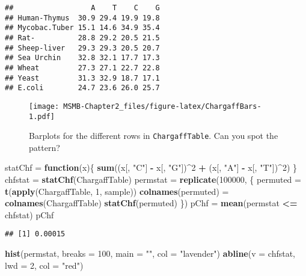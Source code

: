 \documentclass[]{article}
\newenvironment{Shaded}{\begin{snugshade}}{\end{snugshade}}
\newcommand{\KeywordTok}[1]{\textcolor[rgb]{0.13,0.29,0.53}{\textbf{#1}}}
\newcommand{\DataTypeTok}[1]{\textcolor[rgb]{0.13,0.29,0.53}{#1}}
\newcommand{\DecValTok}[1]{\textcolor[rgb]{0.00,0.00,0.81}{#1}}
\newcommand{\StringTok}[1]{\textcolor[rgb]{0.31,0.60,0.02}{#1}}
\newcommand{\ControlFlowTok}[1]{\textcolor[rgb]{0.13,0.29,0.53}{\textbf{#1}}}
\newcommand{\OperatorTok}[1]{\textcolor[rgb]{0.81,0.36,0.00}{\textbf{#1}}}
\newcommand{\NormalTok}[1]{#1}
\begin{document}
\begin{verbatim}
##                  A    T    C    G
## Human-Thymus  30.9 29.4 19.9 19.8
## Mycobac.Tuber 15.1 14.6 34.9 35.4
## Rat-          28.8 29.2 20.5 21.5
## Sheep-liver   29.3 29.3 20.5 20.7
## Sea Urchin    32.8 32.1 17.7 17.3
## Wheat         27.3 27.1 22.7 22.8
## Yeast         31.3 32.9 18.7 17.1
## E.coli        24.7 23.6 26.0 25.7
\end{verbatim}

\begin{figure}
\centering
\texttt{[image: MSMB-Chapter2\_files/figure-latex/ChargaffBars-1.pdf]}
\caption{Barplots for the different rows in \texttt{ChargaffTable}. Can
you spot the pattern?}
\end{figure}

\begin{Shaded}
\begin{Highlighting}[]
\NormalTok{statChf =}\StringTok{ }\ControlFlowTok{function}\NormalTok{(x)\{}
  \KeywordTok{sum}\NormalTok{((x[, }\StringTok{"C"}\NormalTok{] }\OperatorTok{-}\StringTok{ }\NormalTok{x[, }\StringTok{"G"}\NormalTok{])}\OperatorTok{^}\DecValTok{2} \OperatorTok{+}\StringTok{ }\NormalTok{(x[, }\StringTok{"A"}\NormalTok{] }\OperatorTok{-}\StringTok{ }\NormalTok{x[, }\StringTok{"T"}\NormalTok{])}\OperatorTok{^}\DecValTok{2}\NormalTok{)}
\NormalTok{\}}
\NormalTok{chfstat =}\StringTok{ }\KeywordTok{statChf}\NormalTok{(ChargaffTable)}
\NormalTok{permstat =}\StringTok{ }\KeywordTok{replicate}\NormalTok{(}\DecValTok{100000}\NormalTok{, \{}
\NormalTok{  permuted =}\StringTok{ }\KeywordTok{t}\NormalTok{(}\KeywordTok{apply}\NormalTok{(ChargaffTable, }\DecValTok{1}\NormalTok{, sample))}
  \KeywordTok{colnames}\NormalTok{(permuted) =}\StringTok{ }\KeywordTok{colnames}\NormalTok{(ChargaffTable)}
  \KeywordTok{statChf}\NormalTok{(permuted)}
\NormalTok{\})}
\NormalTok{pChf =}\StringTok{ }\KeywordTok{mean}\NormalTok{(permstat }\OperatorTok{<=}\StringTok{ }\NormalTok{chfstat)}
\NormalTok{pChf}
\end{Highlighting}
\end{Shaded}

\begin{verbatim}
## [1] 0.00015
\end{verbatim}

\begin{Shaded}
\begin{Highlighting}[]
\KeywordTok{hist}\NormalTok{(permstat, }\DataTypeTok{breaks =} \DecValTok{100}\NormalTok{, }\DataTypeTok{main =} \StringTok{""}\NormalTok{, }\DataTypeTok{col =} \StringTok{"lavender"}\NormalTok{)}
\KeywordTok{abline}\NormalTok{(}\DataTypeTok{v =}\NormalTok{ chfstat, }\DataTypeTok{lwd =} \DecValTok{2}\NormalTok{, }\DataTypeTok{col =} \StringTok{"red"}\NormalTok{)}
\end{Highlighting}
\end{Shaded}
\end{document}
